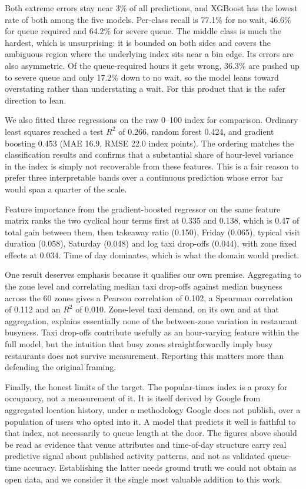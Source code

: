 \documentclass[conference]{IEEEtran}
\begin{document}
Both extreme errors stay near 3\% of all predictions, and XGBoost has the lowest rate of both among the five models. Per-class recall is 77.1\% for no wait, 46.6\% for queue required and 64.2\% for severe queue. The middle class is much the hardest, which is unsurprising: it is bounded on both sides and covers the ambiguous region where the underlying index sits near a bin edge. Its errors are also asymmetric. Of the queue-required hours it gets wrong, 36.3\% are pushed up to severe queue and only 17.2\% down to no wait, so the model leans toward overstating rather than understating a wait. For this product that is the safer direction to lean.

We also fitted three regressions on the raw 0--100 index for comparison. Ordinary least squares reached a test $R^2$ of 0.266, random forest 0.424, and gradient boosting 0.453 (MAE 16.9, RMSE 22.0 index points). The ordering matches the classification results and confirms that a substantial share of hour-level variance in the index is simply not recoverable from these features. This is a fair reason to prefer three interpretable bands over a continuous prediction whose error bar would span a quarter of the scale.

Feature importance from the gradient-boosted regressor on the same feature matrix ranks the two cyclical hour terms first at 0.335 and 0.138, which is 0.47 of total gain between them, then takeaway ratio (0.150), Friday (0.065), typical visit duration (0.058), Saturday (0.048) and log taxi drop-offs (0.044), with zone fixed effects at 0.034. Time of day dominates, which is what the domain would predict.

One result deserves emphasis because it qualifies our own premise. Aggregating to the zone level and correlating median taxi drop-offs against median busyness across the 60 zones gives a Pearson correlation of 0.102, a Spearman correlation of 0.112 and an $R^2$ of 0.010. Zone-level taxi demand, on its own and at that aggregation, explains essentially none of the between-zone variation in restaurant busyness. Taxi drop-offs contribute usefully as an hour-varying feature within the full model, but the intuition that busy zones straightforwardly imply busy restaurants does not survive measurement. Reporting this matters more than defending the original framing.

Finally, the honest limits of the target. The popular-times index is a proxy for occupancy, not a measurement of it. It is itself derived by Google from aggregated location history, under a methodology Google does not publish, over a population of users who opted into it. A model that predicts it well is faithful to that index, not necessarily to queue length at the door. The figures above should be read as evidence that venue attributes and time-of-day structure carry real predictive signal about published activity patterns, and not as validated queue-time accuracy. Establishing the latter needs ground truth we could not obtain as open data, and we consider it the single most valuable addition to this work.
\end{document}
